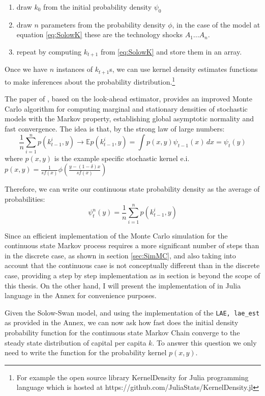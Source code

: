 \documentclass[a4paper,12pt]{article}
\theoremstyle{definition}
\begin{document}
\begin{enumerate}
\item draw ${k_0}$ from the initial probability density $\psi_0$
\item draw $n$ parameters from the probability density $\phi$, in the case of the model at equation \ref{eq:SolowK} these are the technology shocks $A_1 ... A_n$. 
\item  repeat by computing $k_{t+1}$ from \ref{eq:SolowK} and store them in an array.
\end{enumerate}  
Once we have $n$ instances of $k_{t+1}$s, we can use kernel density estimates functions to make inferences about the probability distribution.\footnote{For example the open source library KernelDensity for Julia programming language which is hosted at https://github.com/JuliaStats/KernelDensity.jl} 

The paper of \cite{Stachurski2008}, based on the look-ahead estimator, provides an improved Monte Carlo algorithm for computing marginal and stationary densities of stochastic models with the Markov property, establishing global asymptotic normality and fast convergence. The idea is that, by the strong law of large numbers:
\begin{equation}
\frac{1}{n} \sum_{i=1}^n p(k_{t-1}^i, y)
\to
\mathbb E p(k_{t-1}^i, y)
= \int p(x, y) \psi_{t-1}(x) \, dx
= \psi_t(y)
\end{equation}
where $p(x,y)$ is the example specific stochastic kernel e.i. $p(x, y) = \frac{1}{sf(x)} \phi \left( \frac{y - (1 - \delta) x}{s f(x)} \right)$ 

Therefore, we can write our continuous state probability density as the average of probabilities:
\begin{equation}
\psi_t^n(y) = \frac{1}{n} \sum_{i=1}^n p(k_{t-1}^i, y)
\end{equation}

Since an efficient implementation of the Monte Carlo simulation for the continuous state Markov process requires a more significant number of steps than in the discrete case, as shown in section \ref{sec:SimMC}, and also taking into account that the continuous case is not conceptually different than in the discrete case, providing a step by step implementation as in section  is beyond the scope of this thesis. On the other hand,  I will present the implementation of \cite{Stachurski2008} in Julia language in the Annex for convenience purposes. 

Given the Solow-Swan model, and using the implementation of the \texttt{LAE, lae\_est} as provided in the Annex, we can now ask how fast does the initial density probability function for the continuous state Markov Chain converge to the steady state distribution of capital per capita $k$. To answer this question we only need to write the function for the probability kernel $p(x,y)$.
\end{document}
